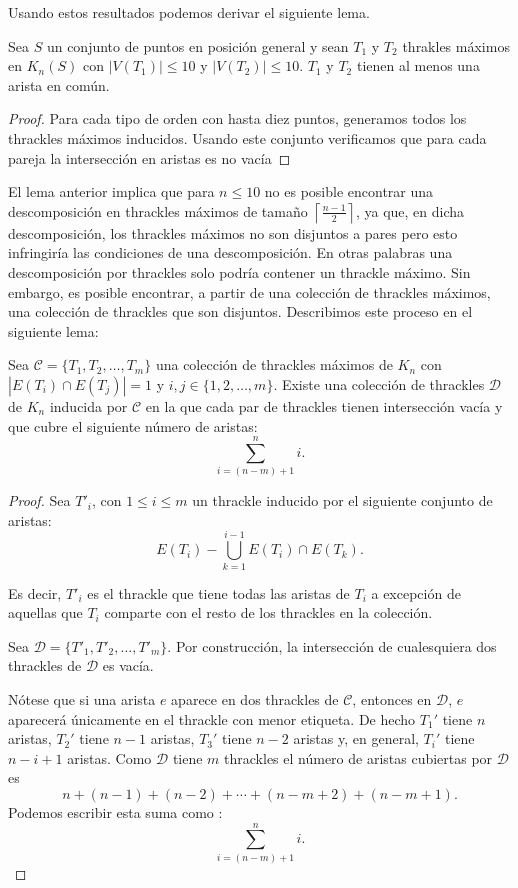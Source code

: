 Usando estos resultados podemos derivar el siguiente lema.
\begin{lemma}\label{lema:thdisjuntos}
  Sea $S$ un conjunto de puntos en posición general y sean $T_1$ y $T_2$ thrakles máximos en $K_n(S)$ con $|V(T_1)|\leq 10$
  y $|V(T_2)|\leq 10$. $T_1$ y $T_2$ tienen al menos una arista en común.
\end{lemma}
\begin{proof}
  Para cada tipo de orden con hasta diez puntos, generamos todos los thrackles
  máximos inducidos. Usando este conjunto verificamos que para cada pareja la intersección en aristas es no vacía
\end{proof}

El lema anterior implica que para $n\leq 10$ no es posible encontrar una
descomposición en thrackles máximos de tamaño
$\left\lceil\frac{n-1}{2}\right\rceil$, ya que, en dicha descomposición, los
thrackles máximos no son disjuntos a pares pero esto infringiría las
condiciones de una descomposición.
En otras palabras una descomposición por thrackles solo podría contener un
thrackle máximo. Sin embargo, es posible encontrar, a partir de una colección
de thrackles máximos, una colección de thrackles que son disjuntos.
Describimos este proceso en el siguiente lema:
\begin{lemma}\label{lema:existedescomp}
  Sea $\mathcal{C}=\{T_1,T_2,\dots,T_m\}$ una colección de thrackles máximos
  de $K_n$ con $|E(T_i)\cap E(T_j)| = 1$ y $ i,j \in \{1,2,\dots,m\}$.
  Existe una colección  de thrackles $\mathcal{D}$ de $K_n$ inducida por
  $\mathcal{C}$ en la que cada par de thrackles tienen intersección vacía y que
  cubre el siguiente número de aristas:
  \[\displaystyle \sum^n_{i=(n-m) + 1}i.\]
\end{lemma}
\begin{proof}
  Sea $T'_i$, con $1 \leq i \leq m$ un thrackle inducido por el siguiente
  conjunto de aristas:
  \[E(T_i) - \bigcup_{k=1}^{i-1} E(T_i)\cap E(T_k).\]

  Es decir, $T'_i$ es el thrackle que tiene todas las aristas de $T_i$
  a excepción de aquellas que $T_i$ comparte con el resto de los thrackles
  en la colección.

  Sea $\mathcal{D}=\{T'_1,T'_2,\dots,T'_m\}$. Por construcción, la intersección
  de cualesquiera dos thrackles de $\mathcal{D}$ es vacía.

  Nótese que si una arista $e$ aparece en dos thrackles de $\mathcal{C}$,
  entonces en $\mathcal{D}$, $e$ aparecerá únicamente en el thrackle con menor
  etiqueta.
  De hecho $T_1'$ tiene $n$ aristas, $T_2'$ tiene $n-1$ aristas, $T_3'$ tiene
  $n-2$ aristas y, en general, $T_i'$ tiene $n-i+1$ aristas. Como $\mathcal{D}$
  tiene $m$ thrackles el número de aristas cubiertas por $\mathcal{D}$ es
  \[ n + (n-1) + (n-2) + \cdots + (n- m + 2) + (n - m + 1).\]
  Podemos escribir esta suma como :
  \[\displaystyle \sum^n_{i=(n-m) + 1}i.\]
\end{proof}
